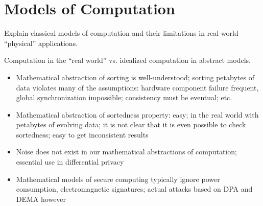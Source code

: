 \documentclass{article}
\newcommand{\jc}[1]{\fbox{Jacques says:} \textbf{#1}}
\begin{document}
\section{Models of Computation}

Explain classical models of computation and their limitations in
real-world ``physical'' applications.

Computation in the ``real world'' vs. idealized computation in
abstract models.
\begin{itemize}
\item Mathematical abstraction of sorting is well-understood; sorting
  petabytes of data violates many of the assumptions: hardware
  component failure frequent, global synchronization impossible;
  consistency must be eventual; etc.
\item Mathematical abstraction of sortedness property: easy; in the
  real world with petabytes of evolving data; it is not clear that it
  is even possible to check sortedness; easy to get inconsistent
  results
\item Noise does not exist in our mathematical abstractions of
  computation; essential use in differential privacy
\item Mathematical models of secure computing typically ignore power
  consumption, electromagnetic signatures; actual attacks based on DPA
  and DEMA however
\end{itemize}


\end{document}
